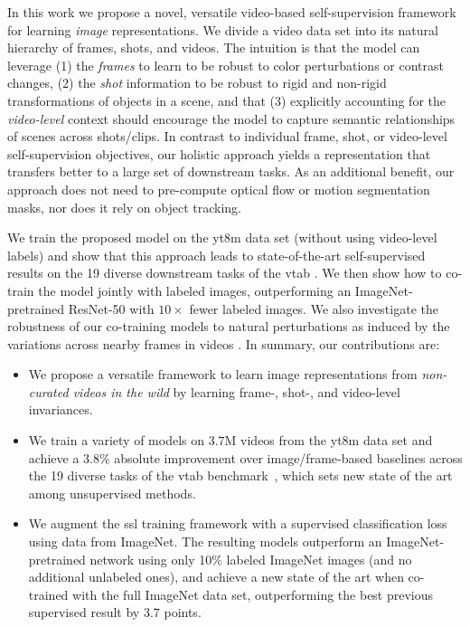 \documentclass[10pt,twocolumn,letterpaper]{article}
\begin{document}
In this work we propose a novel, versatile video-based self-supervision framework for learning \emph{image} representations. We divide a video data set into its natural hierarchy of frames, shots, and videos. The intuition is that the model can leverage (1) the \emph{frames} to learn to be robust to color perturbations or contrast changes, (2) the \emph{shot} information to be robust to rigid and non-rigid transformations of objects in a scene, and that (3) explicitly accounting for the \emph{video-level} context should encourage the model to capture semantic relationships of scenes across shots/clips. In contrast to individual frame, shot, or video-level self-supervision objectives, our holistic approach yields a representation that transfers better to a large set of downstream tasks.
As an additional benefit, our approach does not need to pre-compute optical flow or motion segmentation masks, nor does it rely on object tracking. 

We train the proposed model on the \acrfull{yt8m} data set (without using video-level labels) and show that this approach leads to state-of-the-art self-supervised results on the 19 diverse downstream tasks of the \acrfull{vtab} \cite{zhai2019visual}. We then show how to co-train the model jointly with labeled images, outperforming an ImageNet-pretrained ResNet-50 with $10\times$ fewer labeled images. We also investigate the robustness of our co-training models to natural perturbations as induced by the variations across nearby frames in videos \cite{shankar2019systematic}. In summary, our contributions are:
\begin{itemize}[itemsep=2pt,parsep=2pt]
\item We propose a versatile framework to learn image representations from \emph{non-curated videos in the wild} by learning frame-, shot-, and video-level invariances. 
\item We train a variety of models on $3.7$M videos from the \gls{yt8m} data set and achieve a $3.8$\% absolute improvement over image/frame-based baselines across the 19 diverse tasks of the \gls{vtab} benchmark~\cite{zhai2019visual}, which sets new state of the art among unsupervised methods.
\item We augment the \gls{ssl} training framework with a supervised classification loss using data from ImageNet. The resulting models outperform an ImageNet-pretrained network using only 10\% labeled ImageNet images (and no additional unlabeled ones), and achieve a new state of the art when co-trained with the full ImageNet data set, outperforming the best previous supervised result by $3.7$ points.
\end{itemize}
\end{document}

